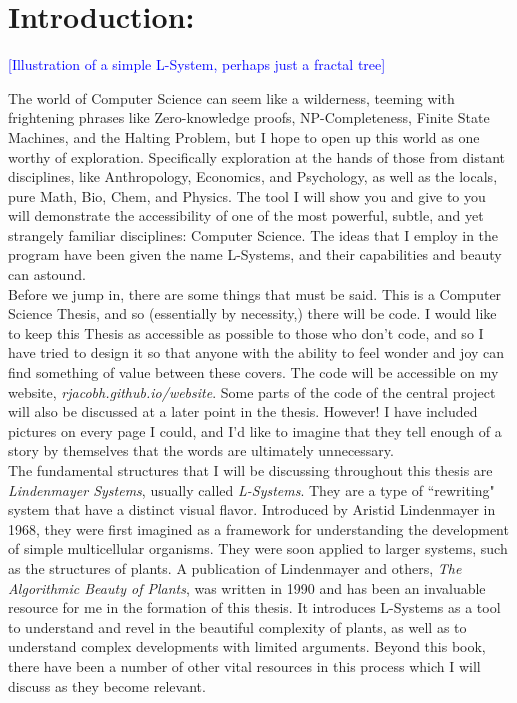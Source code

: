 \documentclass[12pt,twoside]{reedthesis}
\begin{document}
\chapter{Introduction: }
	
\textcolor{blue}{[Illustration of a simple L-System, perhaps just a fractal tree]}

The world of Computer Science can seem like a wilderness, teeming with frightening phrases like Zero-knowledge proofs, NP-Completeness, Finite State Machines, and the Halting Problem, but I hope to open up this world as one worthy of exploration. Specifically exploration at the hands of those from distant disciplines, like Anthropology, Economics, and Psychology, as well as the locals, pure Math, Bio, Chem, and Physics. The tool I will show you and give to you will demonstrate the accessibility of one of the most powerful, subtle, and yet strangely familiar disciplines: Computer Science. The ideas that I employ in the program have been given the name L-Systems, and their capabilities and beauty can astound.\\
	
Before we jump in, there are some things that must be said. This is a Computer Science Thesis, and so (essentially by necessity,) there will be code. I would like to keep this Thesis as accessible as possible to those who don’t code, and so I have tried to design it so that anyone with the ability to feel wonder and joy can find something of value between these covers. The code will be accessible on my website, \textit{rjacobh.github.io/website}. Some parts of the code of the central project will also be discussed at a later point in the thesis. However! I have included pictures on every page I could, and I’d like to imagine that they tell enough of a story by themselves that the words are ultimately unnecessary.\\

The fundamental structures that I will be discussing throughout this thesis are \textit{Lindenmayer Systems}, usually called \textit{L-Systems}. They are a type of ``rewriting" system that have a distinct visual flavor. Introduced by Aristid Lindenmayer in 1968, they were first imagined as a framework for understanding the development of simple multicellular organisms. They were soon applied to larger systems, such as the structures of plants. A publication of Lindenmayer and others, \textit{The Algorithmic Beauty of Plants}, was written in 1990 and has been an invaluable resource for me in the formation of this thesis. It introduces L-Systems as a tool to understand and revel in the beautiful complexity of plants, as well as to understand complex developments with limited arguments. Beyond this book, there have been a number of other vital resources in this process which I will discuss as they become relevant.\\
\end{document}
